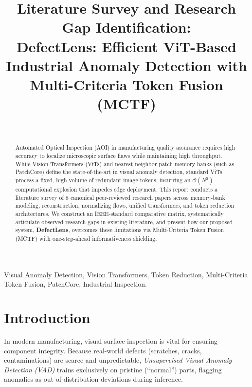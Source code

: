 \documentclass[10pt,journal,compsoc]{IEEEtran}
\begin{document}
\title{Literature Survey and Research Gap Identification: \\
\Large DefectLens: Efficient ViT-Based Industrial Anomaly Detection with Multi-Criteria Token Fusion (MCTF)}

\author{
    \\
}

\maketitle

\begin{abstract}
Automated Optical Inspection (AOI) in manufacturing quality assurance requires high accuracy to localize microscopic surface flaws while maintaining high throughput. While Vision Transformers (ViTs) and nearest-neighbor patch-memory banks (such as PatchCore) define the state-of-the-art in visual anomaly detection, standard ViTs process a fixed, high volume of redundant image tokens, incurring an $\mathcal{O}(N^2)$ computational explosion that impedes edge deployment. This report conducts a literature survey of 8 canonical peer-reviewed research papers across memory-bank modeling, reconstruction, normalizing flows, unified transformers, and token reduction architectures. We construct an IEEE-standard comparative matrix, systematically articulate observed research gaps in existing literature, and present how our proposed system, \textbf{DefectLens}, overcomes these limitations via Multi-Criteria Token Fusion (MCTF) with one-step-ahead informativeness shielding.
\end{abstract}

\begin{IEEEkeywords}
Visual Anomaly Detection, Vision Transformers, Token Reduction, Multi-Criteria Token Fusion, PatchCore, Industrial Inspection.
\end{IEEEkeywords}

\section{Introduction}
In modern manufacturing, visual surface inspection is vital for ensuring component integrity. Because real-world defects (scratches, cracks, contaminations) are scarce and unpredictable, \textit{Unsupervised Visual Anomaly Detection (VAD)} trains exclusively on pristine (``normal'') parts, flagging anomalies as out-of-distribution deviations during inference.
\end{document}
